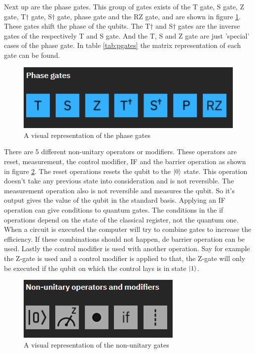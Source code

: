 Next up are the phase gates. This group of gates exists of the T gate, S gate, Z gate, T$\dagger$ gate, S$\dagger$ gate, phase gate and the RZ gate, and are shown in figure \ref{fig:phase gates}. These gates shift the phase of the qubits.
The T$\dagger$ and S$\dagger$ gates are the inverse gates of the respectively T and S gate. And the T, S and Z gate are just 'special' cases of the phase gate.
In table \ref{tab:pgates} the matrix representation of each gate can be found.

\begin{figure} [h]
    \centering
    \includegraphics[width=\textwidth]{img/phase-gates.PNG}
        \caption{A visual representation of the phase gates}
        \label{fig:phase gates}
\end{figure}

There are 5 different non-unitary operators or modifiers. These operators are reset, measurement, the control modifier, IF and the barrier operation as shown in figure \ref{fig:non-uni gates}.
The reset operations resets the qubit to the $\ket{0}$ state. This operation doesn't take any previous state into consideration and is not reversible.
The measurement operation also is not reversible and measures the qubit. So it's output gives the value of the qubit in the standard basis.
Applying an IF operation can give conditions to quantum gates. The conditions in the if operations depend on the state of the classical register, not the quantum one.
When a circuit is executed the computer will try to combine gates to increase the efficiency. If these combinations should not happen, de barrier operation can be used.
Lastly the control modifier is used with another operation. Say for example the Z-gate is used and a control modifier is applied to that, the Z-gate will only be executed if the qubit on which the control lays is in state $\ket{1}$.

\begin{figure} [h]
    \centering
    \includegraphics[width=\textwidth]{img/non-unitary-gates.PNG}
        \caption{A visual representation of the non-unitary gates}
        \label{fig:non-uni gates}
\end{figure}

